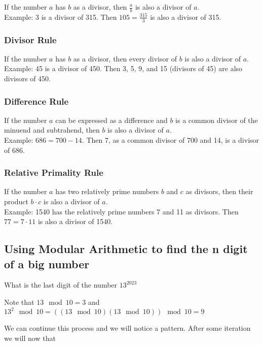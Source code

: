 If the number \( a \) has \( b \) as a divisor, then \( \frac{a}{b} \) is also a divisor of \( a \). \\
Example: 3 is a divisor of 315. Then \( 105 = \frac{315}{3} \) is also a divisor of 315.

\subsubsection*{Divisor Rule}

If the number \( a \) has \( b \) as a divisor, then every divisor of \( b \) is also a divisor of \( a \). \\
Example: 45 is a divisor of 450. Then 3, 5, 9, and 15 (divisors of 45) are also divisors of 450.

\subsubsection*{Difference Rule}

If the number \( a \) can be expressed as a difference and \( b \) is a common divisor of the minuend and subtrahend, then \( b \) is also a divisor of \( a \). \\
Example: \( 686 = 700 - 14 \). Then 7, as a common divisor of 700 and 14, is a divisor of 686.

\subsubsection*{Relative Primality Rule}

If the number \( a \) has two relatively prime numbers \( b \) and \( c \) as divisors, then their product \( b \cdot c \) is also a divisor of \( a \). \\
Example: 1540 has the relatively prime numbers 7 and 11 as divisors. Then \( 77 = 7 \cdot 11 \) is also a divisor of 1540.

\subsection{Using Modular Arithmetic to find the n digit of a big number}

What is the last digit of the number \(13^{2023}\)

Note that \(13 \mod 10 = 3\) and  \(13^2 \mod 10 =  ((13 \mod 10)  (13\mod 10)) \mod 10 = 9 \)

We can continue this process and we will notice a pattern. After some iteration we will now that

